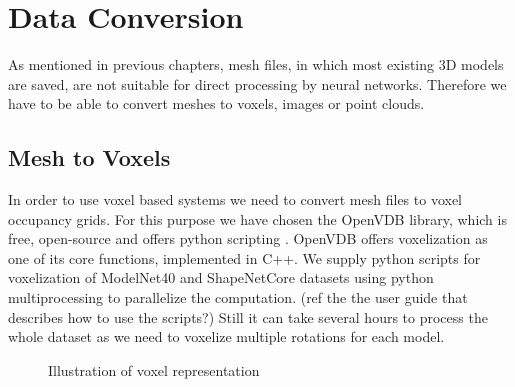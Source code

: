 \section{Data Conversion}
As mentioned in previous chapters,  mesh files, in which most existing 3D models are saved, are not suitable for direct processing by neural networks. Therefore we have to be able to convert meshes to voxels, images or point clouds.

\subsection{Mesh to Voxels}
In order to use voxel based systems we need to convert mesh files to voxel occupancy grids. For this purpose we have chosen the OpenVDB library, which is free, open-source and offers python scripting \cite{museth_openvdb:_2013}. OpenVDB offers voxelization as one of its core functions, implemented in C++. We supply python scripts for voxelization of ModelNet40 and ShapeNetCore datasets using python multiprocessing to parallelize the computation. (ref the the user guide that describes how to use the scripts?) Still it can take several hours to process the whole dataset as we need to voxelize multiple rotations for each model. 

\begin{figure}[!h]
	\centering
	\qquad
	\caption{Illustration of voxel representation}
\end{figure}

